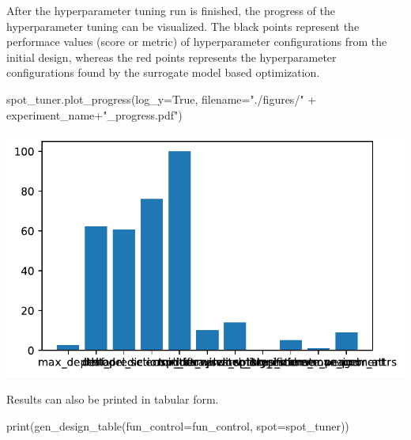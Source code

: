 \documentclass[
  letterpaper,
  DIV=11,
  numbers=noendperiod]{scrreprt}
\newenvironment{Shaded}{\begin{snugshade}}{\end{snugshade}}
\newcommand{\BuiltInTok}[1]{\textcolor[rgb]{0.00,0.23,0.31}{#1}}
\newcommand{\NormalTok}[1]{\textcolor[rgb]{0.00,0.23,0.31}{#1}}
\newcommand{\OperatorTok}[1]{\textcolor[rgb]{0.37,0.37,0.37}{#1}}
\newcommand{\StringTok}[1]{\textcolor[rgb]{0.13,0.47,0.30}{#1}}
\newcommand{\VariableTok}[1]{\textcolor[rgb]{0.07,0.07,0.07}{#1}}
\begin{document}
After the hyperparameter tuning run is finished, the progress of the
hyperparameter tuning can be visualized. The black points represent the
performace values (score or metric) of hyperparameter configurations
from the initial design, whereas the red points represents the
hyperparameter configurations found by the surrogate model based
optimization.

\begin{Shaded}
\begin{Highlighting}[]
\NormalTok{spot\_tuner.plot\_progress(log\_y}\OperatorTok{=}\VariableTok{True}\NormalTok{, filename}\OperatorTok{=}\StringTok{"./figures/"} \OperatorTok{+}\NormalTok{ experiment\_name}\OperatorTok{+}\StringTok{"\_progress.pdf"}\NormalTok{)}
\end{Highlighting}
\end{Shaded}

\includegraphics{024_spot_hpt_river_friedman_hatr_files/figure-pdf/cell-19-output-1.pdf}

Results can also be printed in tabular form.

\begin{Shaded}
\begin{Highlighting}[]
\BuiltInTok{print}\NormalTok{(gen\_design\_table(fun\_control}\OperatorTok{=}\NormalTok{fun\_control, spot}\OperatorTok{=}\NormalTok{spot\_tuner))}
\end{Highlighting}
\end{Shaded}
\end{document}
